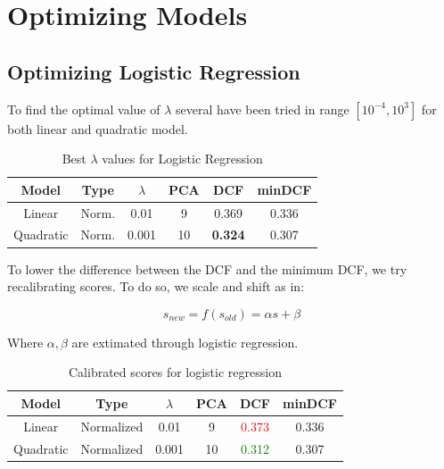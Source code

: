 \documentclass[hidelinks, 12pt, twocolumn]{article}
\begin{document}
\section{Optimizing Models}

\subsection{Optimizing Logistic Regression}

To find the optimal value of $\lambda$ several have been tried in range  $\left[10^{-4}, 10^3\right]$ for both linear and quadratic model.

\begin{table}[H]
    \centering
    \tiny
        \begin{tabular}{||c|c|c|c|c|c||}
            \hline
            Model & Type & $\lambda$ & PCA & DCF & minDCF \\
            \hline
            \hline
            Linear & Norm. & 0.01 & 9 & 0.369 &  0.336  \\
            Quadratic & Norm. & 0.001 & 10 & {\bf 0.324} &  0.307  \\
            \hline
    \end{tabular}
    \caption{Best $\lambda$ values for Logistic Regression}
\end{table}

To lower the difference between the DCF and the minimum DCF,
we try recalibrating scores.
To do so, we scale and shift as in:

$$ s_{new} = f(s_{old}) = \alpha s + \beta $$

Where $\alpha, \beta$ are extimated through logistic regression.

\begin{table}[H]
    \tiny
    \centering
        \begin{tabular}{||c|c|c|c|c|c||}
            \hline
            Model & Type & $\lambda$ & PCA & DCF & minDCF \\
            \hline
            \hline
            Linear & Normalized & 0.01 & 9 & \textcolor{red}{0.373} &  0.336  \\
            Quadratic & Normalized & 0.001 & 10 & \textcolor{green}{0.312} &  0.307  \\
            \hline
    \end{tabular}
    \caption{Calibrated scores for logistic regression}
    \label{logregcalibration}
\end{table}
\end{document}
